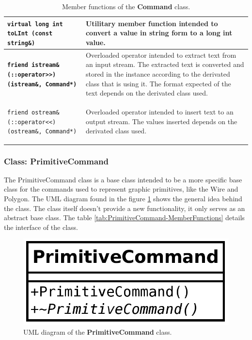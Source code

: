 \documentclass[11pt,twoside,openany,x11names,svgnames]{memoir}
\begin{document}
\begin{table}[h]
\begin{tabular}{| >{\bfseries}p{8.5cm} | p{7cm} |}
	\hline
	
	\texttt{virtual long int toLInt (const string\&)} & Utilitary member function intended to convert a value in string form to a long int value. \\
	
	\hline
	
	\texttt{friend istream\& (::operator>>) (istream\&, Command*)} & Overloaded operator intended to extract text from an input stream. The extracted text is converted and stored in the instance according to the derivated class that is using it. The format expected of the text depends on the derivated class used. \\
	
	\hline
	
	\texttt{friend ostream\& (::operator<<) (ostream\&, Command*)} & Overloaded operator intended to insert text to an output stream. The values inserted depends on the derivated class used. \\
	
	\hline
\end{tabular}
\caption{Member functions of the \textbf{Command} class.}
\label{tab:Command-MemberFunctions}
\end{table}

\clearpage

\subsubsection{Class: PrimitiveCommand}\label{Class-PrimitiveCommand}

The PrimitiveCommand class is a base class intended to be a more specific base class for the commands used to represent graphic primitives, like the Wire and Polygon. The UML diagram found in the figure \ref{fig:class-primitive-command} shows the general idea behind the class. The class itself doesn't provide a new functionality, it only serves as an abstract base class. The table \ref{tab:PrimitiveCommand-MemberFunctions} details the interface of the class.

\begin{figure}
	\centering
	\includegraphics[scale=0.2, clip=true, trim= 0pt 0pt 0pt 0pt]{images/chapter03-image17}
	\caption{UML diagram of the \textbf{PrimitiveCommand} class.}
	\label{fig:class-primitive-command}
\end{figure}
\end{document}
